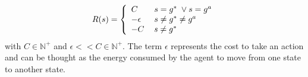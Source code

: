 \documentclass[letterpaper, 10 pt, conference]{ieeeconf}  %
\newcommand{\Ne}{\mathbb {N}}
\newcommand\NB[1]{$\spadesuit$\footnote{NB: #1}}
\begin{document}
%
  \begin{equation}
    R(s)=\left\{
                \begin{array}{ll}
                  C\hspace{2em} s = g^* \; \vee s = g^a \\
                  -\epsilon\hspace{1.6em} s \ne g^* \ne g^a\\
                  -C\hspace{1.2em} s \ne g^*
                \end{array}
              \right.
  \end{equation}
with $C \in \Ne^+$  and $\epsilon << C \in \Ne^+ $. The term $\epsilon$ represents the cost to take an action and can be thought as the energy consumed by the agent to move from one state to another state.
\end{document}
